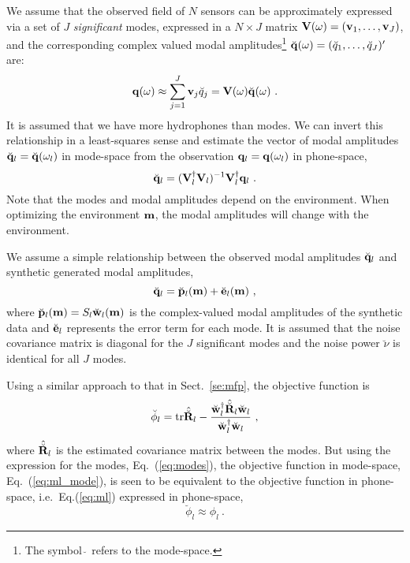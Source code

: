 \documentclass{saclantc}
\newcommand{\modespace}[1]{\breve{{#1}}}
\begin{document}
We assume that the observed field of $N$ sensors can be approximately expressed via 
a set of $J$ {\it significant\/} modes, expressed in a 
$N\times J$ matrix ${\bf V}(\omega)=({\bf v}_1,\ldots,{\bf v}_J)$, 
and the corresponding complex valued modal 
amplitudes\footnote{ The symbol $\modespace{~}$ refers to the mode-space.} 
$\modespace{\bf q}(\omega)=(\modespace{q}_1,\ldots,\modespace{q}_J)'$ are:
\begin{equation}
  {\bf q}(\omega) \approx 
  \sum\limits^J_{j=1}{\bf v}_j \modespace{q}_j =
  {\bf V}(\omega) \modespace{\bf q}(\omega)~.
  \label{eq:modes}
\end{equation}
It is assumed that we have more hydrophones than modes.
We can invert this relationship in a least-squares sense and estimate
the vector of modal amplitudes 
$\modespace{\bf q}_l=\modespace{\bf q}(\omega_l)$ in mode-space from the 
observation ${\bf q}_l={\bf q}(\omega_l)$ in phone-space,
\begin{equation}
   \modespace{{\bf q}}_l = 
   ({\bf V}^{\dagger}_l{\bf V}_l)^{-1}{\bf V}^{\dagger}_l
        {\bf q}_l~.
\end{equation}
Note that the modes and modal amplitudes depend on the
environment. When optimizing the environment ${\bf m} $, the modal
amplitudes will change with the environment.


We assume a simple  relationship between the observed modal amplitudes
$ \modespace{\bf q}_l$  and synthetic generated modal amplitudes, 
\begin{equation}
 \modespace{\bf q}_l = \modespace{\bf p}_l({\bf m}) + 
 \modespace{\bf e}_l({\bf m})~,
\end{equation}
where $\modespace{\bf p}_l({\bf m})=S_l \modespace{\bf w}_l({\bf m})$ is the
complex-valued modal amplitudes of
the synthetic data  and $ \modespace{\bf e}_l$ represents the error term for
each mode.
%
It is assumed that the noise covariance matrix is diagonal for the $J$ 
significant modes and the  noise power $\modespace{\nu}$ is identical 
for all $J$ modes.

Using a similar approach to that in Sect.~\ref{se:mfp}, the objective function is
\begin{equation}
  \modespace{\phi}_l = \mbox{tr} \hat{\modespace{\bf R}}_l - 
  \frac{{\modespace{\bf w}_l}^\dagger \hat{\modespace{\bf R}}_l
        \modespace{\bf w}_l}
       {{\modespace{\bf w}_l}^\dagger \modespace{\bf w}_l}~, 
  \label{eq:ml_mode}
\end{equation}
where $\hat{\modespace{\bf R}}_l$ is the estimated covariance matrix between
the modes. But  using the expression for the modes,
Eq.~(\ref{eq:modes}), the objective function in mode-space, 
Eq.~(\ref{eq:ml_mode}), is  seen to be equivalent to the objective
function in  phone-space, i.e.\,  Eq.(\ref{eq:ml})
expressed in phone-space, 
\begin{equation}
 \modespace{\phi}_l \approx \phi_l~. 
\end{equation}
\end{document}
